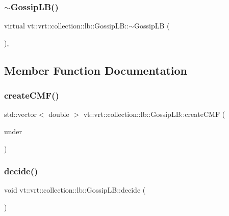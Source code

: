 \subsubsection{\texorpdfstring{$\sim$\+Gossip\+L\+B()}{~GossipLB()}}
{\footnotesize\ttfamily virtual vt\+::vrt\+::collection\+::lb\+::\+Gossip\+L\+B\+::$\sim$\+Gossip\+LB (\begin{DoxyParamCaption}{ }\end{DoxyParamCaption})\hspace{0.3cm}{\ttfamily [inline]}, {\ttfamily [virtual]}}



\subsection{Member Function Documentation}
\mbox{\label{structvt_1_1vrt_1_1collection_1_1lb_1_1_gossip_l_b_abde7527c3d55e4b9114ace8df4d7c0b9}} 
\subsubsection{\texorpdfstring{create\+C\+M\+F()}{createCMF()}}
{\footnotesize\ttfamily std\+::vector$<$ double $>$ vt\+::vrt\+::collection\+::lb\+::\+Gossip\+L\+B\+::create\+C\+MF (\begin{DoxyParamCaption}\item[{\hyperlink{structvt_1_1vrt_1_1collection_1_1lb_1_1_gossip_l_b_abb53f1d4bd3c37f3e68c3b5b0e1f1c86}{Node\+Set\+Type} const \&}]{under }\end{DoxyParamCaption})\hspace{0.3cm}{\ttfamily [protected]}}

\mbox{\label{structvt_1_1vrt_1_1collection_1_1lb_1_1_gossip_l_b_a2a990e5bdf182e4705a4ee4082e267a3}} 
\subsubsection{\texorpdfstring{decide()}{decide()}}
{\footnotesize\ttfamily void vt\+::vrt\+::collection\+::lb\+::\+Gossip\+L\+B\+::decide (\begin{DoxyParamCaption}{ }\end{DoxyParamCaption})\hspace{0.3cm}{\ttfamily [protected]}}

